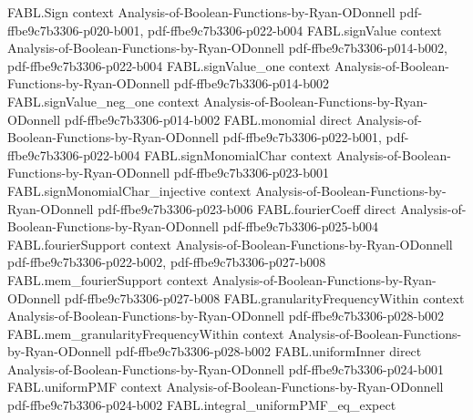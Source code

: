 \begin{theorem}
\label{FABL.FiniteFourierBasis.fourierCoeff_orthogonalComponent}
\leanok
{}
\proofstep
  {FABL.Sign}
  {context}
  {Analysis-of-Boolean-Functions-by-Ryan-ODonnell}
  {pdf-ffbe9c7b3306-p020-b001,
    pdf-ffbe9c7b3306-p022-b004}
\proofstep
  {FABL.signValue}
  {context}
  {Analysis-of-Boolean-Functions-by-Ryan-ODonnell}
  {pdf-ffbe9c7b3306-p014-b002,
    pdf-ffbe9c7b3306-p022-b004}
\proofstep
  {FABL.signValue_one}
  {context}
  {Analysis-of-Boolean-Functions-by-Ryan-ODonnell}
  {pdf-ffbe9c7b3306-p014-b002}
\proofstep
  {FABL.signValue_neg_one}
  {context}
  {Analysis-of-Boolean-Functions-by-Ryan-ODonnell}
  {pdf-ffbe9c7b3306-p014-b002}
\proofstep
  {FABL.monomial}
  {direct}
  {Analysis-of-Boolean-Functions-by-Ryan-ODonnell}
  {pdf-ffbe9c7b3306-p022-b001,
    pdf-ffbe9c7b3306-p022-b004}
\proofstep
  {FABL.signMonomialChar}
  {context}
  {Analysis-of-Boolean-Functions-by-Ryan-ODonnell}
  {pdf-ffbe9c7b3306-p023-b001}
\proofstep
  {FABL.signMonomialChar_injective}
  {context}
  {Analysis-of-Boolean-Functions-by-Ryan-ODonnell}
  {pdf-ffbe9c7b3306-p023-b006}
\proofstep
  {FABL.fourierCoeff}
  {direct}
  {Analysis-of-Boolean-Functions-by-Ryan-ODonnell}
  {pdf-ffbe9c7b3306-p025-b004}
\proofstep
  {FABL.fourierSupport}
  {context}
  {Analysis-of-Boolean-Functions-by-Ryan-ODonnell}
  {pdf-ffbe9c7b3306-p022-b002,
    pdf-ffbe9c7b3306-p027-b008}
\proofstep
  {FABL.mem_fourierSupport}
  {context}
  {Analysis-of-Boolean-Functions-by-Ryan-ODonnell}
  {pdf-ffbe9c7b3306-p027-b008}
\proofstep
  {FABL.granularityFrequencyWithin}
  {context}
  {Analysis-of-Boolean-Functions-by-Ryan-ODonnell}
  {pdf-ffbe9c7b3306-p028-b002}
\proofstep
  {FABL.mem_granularityFrequencyWithin}
  {context}
  {Analysis-of-Boolean-Functions-by-Ryan-ODonnell}
  {pdf-ffbe9c7b3306-p028-b002}
\proofstep
  {FABL.uniformInner}
  {direct}
  {Analysis-of-Boolean-Functions-by-Ryan-ODonnell}
  {pdf-ffbe9c7b3306-p024-b001}
\proofstep
  {FABL.uniformPMF}
  {context}
  {Analysis-of-Boolean-Functions-by-Ryan-ODonnell}
  {pdf-ffbe9c7b3306-p024-b002}
\proofstep
  {FABL.integral_uniformPMF_eq_expect}

\end{theorem}
